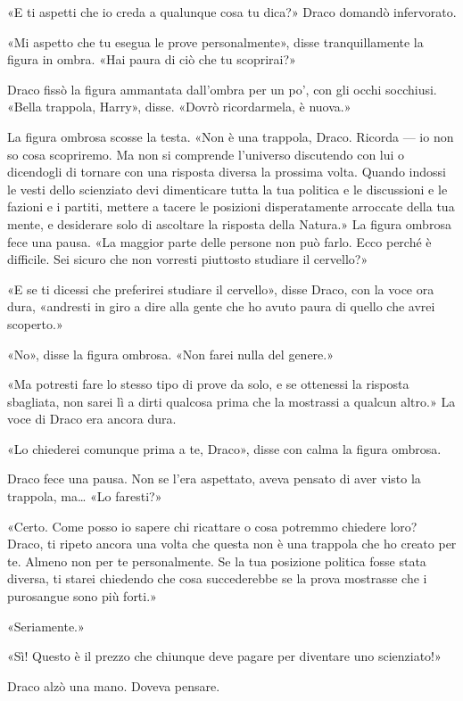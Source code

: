 «E ti aspetti che io creda a qualunque cosa tu dica?» Draco domandò infervorato.

«Mi aspetto che tu esegua le prove personalmente», disse tranquillamente la figura in ombra. «Hai paura di ciò che tu scoprirai?»

Draco fissò la figura ammantata dall’ombra per un po’, con gli occhi socchiusi. «Bella trappola, Harry», disse. «Dovrò ricordarmela, è nuova.»

La figura ombrosa scosse la testa. «Non è una trappola, Draco. Ricorda — io non so cosa scopriremo. Ma non si comprende l’universo discutendo con lui o dicendogli di tornare con una risposta diversa la prossima volta. Quando indossi le vesti dello scienziato devi dimenticare tutta la tua politica e le discussioni e le fazioni e i partiti, mettere a tacere le posizioni disperatamente arroccate della tua mente, e desiderare solo di ascoltare la risposta della Natura.» La figura ombrosa fece una pausa. «La maggior parte delle persone non può farlo. Ecco perché è difficile. Sei sicuro che non vorresti piuttosto studiare il cervello?»

«E se ti dicessi che preferirei studiare il cervello», disse Draco, con la voce ora dura, «andresti in giro a dire alla gente che ho avuto paura di quello che avrei scoperto.»

«No», disse la figura ombrosa. «Non farei nulla del genere.»

«Ma potresti fare lo stesso tipo di prove da solo, e se ottenessi la risposta sbagliata, non sarei lì a dirti qualcosa prima che la mostrassi a qualcun altro.» La voce di Draco era ancora dura.

«Lo chiederei comunque prima a te, Draco», disse con calma la figura ombrosa.

Draco fece una pausa. Non se l’era aspettato, aveva pensato di aver visto la trappola, ma… «Lo faresti?»

«Certo. Come posso io sapere chi ricattare o cosa potremmo chiedere loro? Draco, ti ripeto ancora una volta che questa non è una trappola che ho creato per te. Almeno non per te personalmente. Se la tua posizione politica fosse stata diversa, ti starei chiedendo che cosa succederebbe se la prova mostrasse che i purosangue sono più forti.»

«Seriamente.»

«Sì! Questo è il prezzo che chiunque deve pagare per diventare uno scienziato!»

Draco alzò una mano. Doveva pensare.

